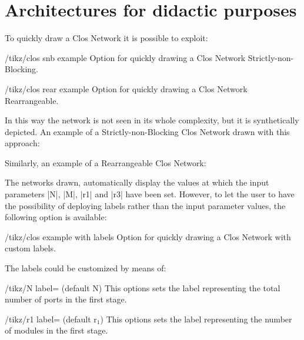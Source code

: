 \documentclass{ltxdoc}
\begin{document}
\section{Architectures for didactic purposes}
\label{sec:dida}
To quickly draw a Clos Network  it is possible to exploit:
\begin{key}{/tikz/clos snb example}
    Option for quickly drawing a Clos Network Strictly-non-Blocking.
\end{key}
\begin{key}{/tikz/clos rear example}
    Option for quickly drawing a Clos Network Rearrangeable.
\end{key}
In this way the network is not seen in its whole complexity, but it is synthetically  depicted. An example of a Strictly-non-Blocking Clos Network drawn with this approach:
\begin{codeexample}[]
\end{codeexample}

Similarly, an example of a Rearrangeable Clos Network:
\begin{codeexample}[]
\end{codeexample}

The networks drawn, automatically display the values at which the input parameters |N|, |M|, |r1| and |r3| have been set. However, to let the user to have the possibility of deploying labels rather than the input parameter values, the following option is available:

\begin{key}{/tikz/clos example with labels}
    Option for quickly drawing a Clos Network with custom labels.
\end{key}

The labels could be customized by means of:
\begin{key}{/tikz/N label= (default N)}
    This options sets the label representing the total number of ports in the first stage.
\end{key}

\begin{key}{/tikz/r1 label= (default r$_1$)}
    This options sets the label representing the number of modules in the first stage.
\end{key}
\end{document}
